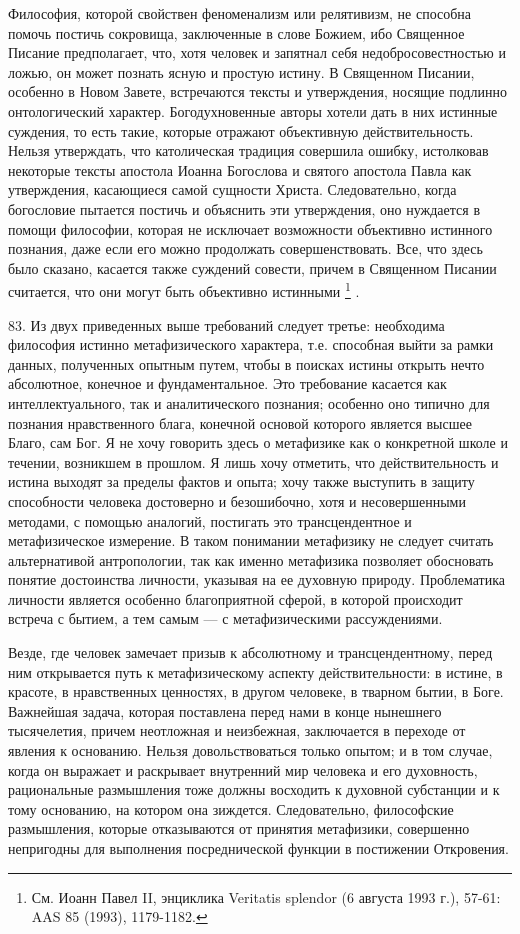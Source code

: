 \documentclass[a5paper,10pt]{article}
\begin{document}
Философия, которой свойствен феноменализм или релятивизм, не способна помочь
постичь сокровища, заключенные в слове Божием, ибо Священное Писание
предполагает, что, хотя человек и запятнал себя недобросовестностью и ложью, он
может познать ясную и простую истину. В Священном Писании, особенно в Новом
Завете, встречаются тексты и утверждения, носящие подлинно онтологический
характер. Богодухновенные авторы хотели дать в них истинные суждения, то есть
такие, которые отражают объективную действительность. Нельзя утверждать, что
католическая традиция совершила ошибку, истолковав некоторые тексты апостола
Иоанна Богослова и святого апостола Павла как утверждения, касающиеся самой
сущности Христа. Следовательно, когда богословие пытается постичь и объяснить
эти утверждения, оно нуждается в помощи философии, которая не исключает
возможности объективно истинного познания, даже если его можно продолжать
совершенствовать. Все, что здесь было сказано, касается также суждений совести,
причем в Священном Писании считается, что они могут быть объективно
истинными \footnote{См. Иоанн Павел II, энциклика Veritatis splendor (6 августа
1993 г.), 57-61: AAS 85 (1993), 1179-1182.} .

83. Из двух приведенных выше требований следует третье: необходима философия
истинно метафизического характера, т.е. способная выйти за рамки данных,
полученных опытным путем, чтобы в поисках истины открыть нечто абсолютное,
конечное и фундаментальное. Это требование касается как интеллектуального, так
и аналитического познания; особенно оно типично для познания нравственного
блага, конечной основой которого является высшее Благо, сам Бог. Я не хочу
говорить здесь о метафизике как о конкретной школе и течении, возникшем в
прошлом. Я лишь хочу отметить, что действительность и истина выходят за пределы
фактов и опыта; хочу также выступить в защиту способности человека достоверно и
безошибочно, хотя и несовершенными методами, с помощью аналогий, постигать это
трансцендентное и метафизическое измерение. В таком понимании метафизику не
следует считать альтернативой антропологии, так как именно метафизика позволяет
обосновать понятие достоинства личности, указывая на ее духовную природу.
Проблематика личности является особенно благоприятной сферой, в которой
происходит встреча с бытием, а тем самым — с метафизическими рассуждениями.

Везде, где человек замечает призыв к абсолютному и трансцендентному, перед ним
открывается путь к метафизическому аспекту действительности: в истине, в
красоте, в нравственных ценностях, в другом человеке, в тварном бытии, в Боге.
Важнейшая задача, которая поставлена перед нами в конце нынешнего тысячелетия,
причем неотложная и неизбежная, заключается в переходе от явления к основанию.
Нельзя довольствоваться только опытом; и в том случае, когда он выражает и
раскрывает внутренний мир человека и его духовность, рациональные размышления
тоже должны восходить к духовной субстанции и к тому основанию, на котором она
зиждется. Следовательно, философские размышления, которые отказываются от
принятия метафизики, совершенно непригодны для выполнения посреднической
функции в постижении Откровения.
\end{document}

